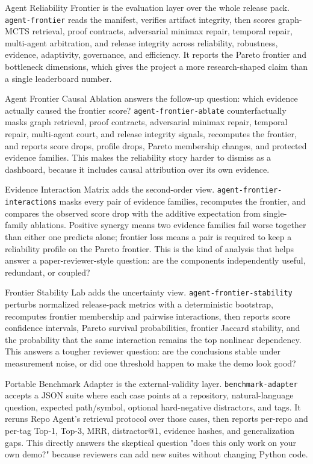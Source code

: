 \documentclass[UTF8,12pt,openany]{ctexbook}
\begin{document}
Agent Reliability Frontier is the evaluation layer over the whole release pack. \texttt{agent-frontier} reads the manifest, verifies artifact integrity, then scores graph-MCTS retrieval, proof contracts, adversarial minimax repair, temporal repair, multi-agent arbitration, and release integrity across reliability, robustness, evidence, adaptivity, governance, and efficiency. It reports the Pareto frontier and bottleneck dimensions, which gives the project a more research-shaped claim than a single leaderboard number.\par

Agent Frontier Causal Ablation answers the follow-up question: which evidence actually caused the frontier score? \texttt{agent-frontier-ablate} counterfactually masks graph retrieval, proof contracts, adversarial minimax repair, temporal repair, multi-agent court, and release integrity signals, recomputes the frontier, and reports score drops, profile drops, Pareto membership changes, and protected evidence families. This makes the reliability story harder to dismiss as a dashboard, because it includes causal attribution over its own evidence.\par

Evidence Interaction Matrix adds the second-order view. \texttt{agent-frontier-interactions} masks every pair of evidence families, recomputes the frontier, and compares the observed score drop with the additive expectation from single-family ablations. Positive synergy means two evidence families fail worse together than either one predicts alone; frontier loss means a pair is required to keep a reliability profile on the Pareto frontier. This is the kind of analysis that helps answer a paper-reviewer-style question: are the components independently useful, redundant, or coupled?\par

Frontier Stability Lab adds the uncertainty view. \texttt{agent-frontier-stability} perturbs normalized release-pack metrics with a deterministic bootstrap, recomputes frontier membership and pairwise interactions, then reports score confidence intervals, Pareto survival probabilities, frontier Jaccard stability, and the probability that the same interaction remains the top nonlinear dependency. This answers a tougher reviewer question: are the conclusions stable under measurement noise, or did one threshold happen to make the demo look good?\par

Portable Benchmark Adapter is the external-validity layer. \texttt{benchmark-adapter} accepts a JSON suite where each case points at a repository, natural-language question, expected path/symbol, optional hard-negative distractors, and tags. It reruns Repo Agent's retrieval protocol over those cases, then reports per-repo and per-tag Top-1, Top-3, MRR, distractor@1, evidence hashes, and generalization gaps. This directly answers the skeptical question "does this only work on your own demo?" because reviewers can add new suites without changing Python code.\par
\end{document}
